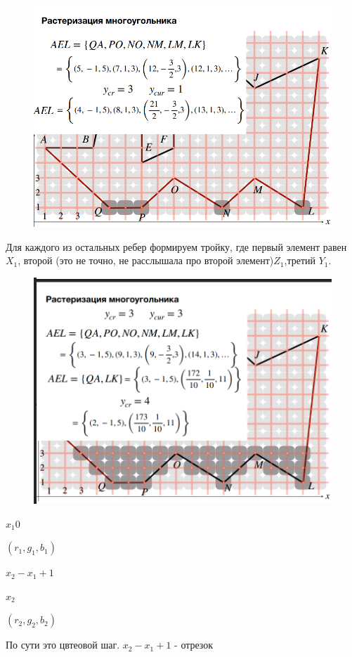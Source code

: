 \documentclass{article}
\begin{document}
\begin{figure} [H]
    \includegraphics[width=0.70\linewidth]{Снимок экрана 2025-05-05 122011.png}
\end{figure}



Для каждого из остальных ребер формируем тройку, где первый элемент равен $X_1$, 
второй (это не точно, не расслышала про второй элемент)$Z_1$,третий $Y_1$.


\begin{figure} [H]
    \includegraphics[width=0.70\linewidth]{Снимок экрана 2025-05-05 122144.png}
\end{figure}


$x_1 0$

$(r_1,g_1,b_1)$

$x_2-x_1+1$

\vspace{1mm}

$x_2$

$(r_2,g_2,b_2)$

По сути это цвтеовой шаг. $x_2-x_1+1$ - отрезок
\end{document}

